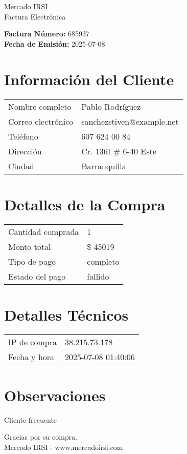 \documentclass[12pt]{article}
\begin{document}
\begin{center}
    \Huge Mercado IRSI \\
    \Large Factura Electrónica
\end{center}

\vspace{0.5cm}

\noindent \textbf{Factura Número:} 685937 \\
\textbf{Fecha de Emisión:} 2025-07-08

\vspace{0.5cm}

\section*{Información del Cliente}
\begin{longtable}{ll}
Nombre completo & Pablo Rodríguez \\
Correo electrónico & sanchezstiven@example.net \\
Teléfono & 607 624 00 84 \\
Dirección & Cr. 136I \# 6-40 Este \\
Ciudad & Barranquilla \\
\end{longtable}

\vspace{0.5cm}

\section*{Detalles de la Compra}
\begin{longtable}{ll}
Cantidad comprada & 1 \\
Monto total & \$ 45019 \\
Tipo de pago & completo \\
Estado del pago & fallido \\
\end{longtable}

\vspace{0.5cm}

\section*{Detalles Técnicos}
\begin{longtable}{ll}
IP de compra & 38.215.73.178 \\
Fecha y hora & 2025-07-08 01:40:06 \\
\end{longtable}

\vspace{0.5cm}

\section*{Observaciones}
Cliente frecuente

\vspace{0.5cm}

\begin{center}
    Gracias por su compra. \\
    Mercado IRSI - www.mercadoirsi.com
\end{center}
\end{document}
